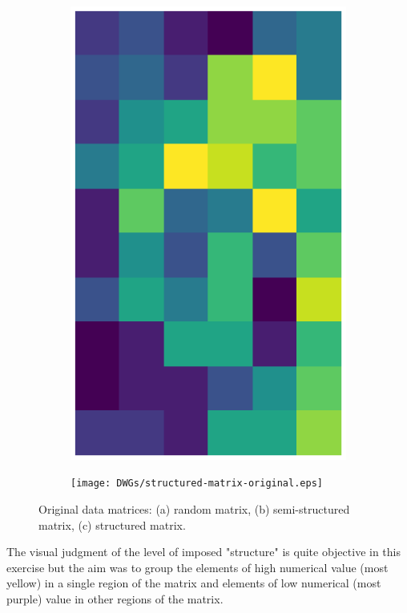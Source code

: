 \documentclass[10pt,twocolumn]{article}
\begin{document}
\begin{figure}[H]
\begin{subfigure}[t]{.15\textwidth}
\includegraphics[scale=.2]{DWGs/semi-structured-matrix-original.eps}
\caption{ }
\end{subfigure}
\begin{subfigure}[t]{.15\textwidth}
\centering
\texttt{[image: DWGs/structured-matrix-original.eps]}
\caption{ }
\end{subfigure}
\caption{Original data matrices: (a) random matrix, (b) semi-structured matrix, (c) structured matrix.}
\label{fig:matrices}
\end{figure}

The visual judgment of the level of imposed "structure" is quite objective in this exercise but the aim was to group the elements of high numerical value (most yellow) in a single region of the matrix and elements of low numerical (most purple) value in other regions of the matrix.
\end{document}
